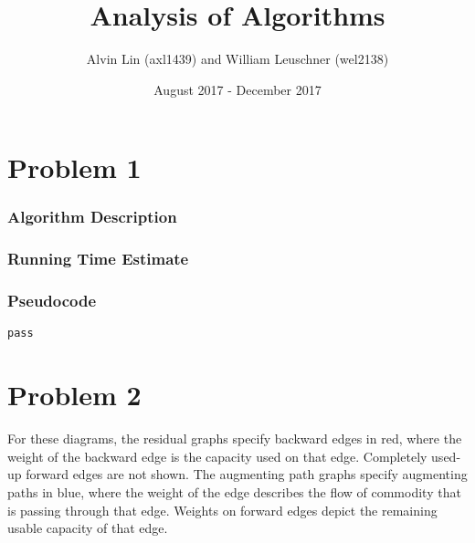 \documentclass{math}
\title{Analysis of Algorithms}
\author{Alvin Lin (axl1439) and William Leuschner (wel2138)}
\date{August 2017 - December 2017}
\begin{document}
\maketitle


\section*{Problem 1}


\subsubsection*{Algorithm Description}


\subsubsection*{Running Time Estimate}


\subsubsection*{Pseudocode}

\begin{lstlisting}
pass
\end{lstlisting}


\section*{Problem 2}

For these diagrams, the residual graphs specify backward edges in red, where the
weight of the backward edge is the capacity used on that edge.  Completely
used-up forward edges are not shown.  The augmenting path graphs specify
augmenting paths in blue, where the weight of the edge describes the flow of
commodity that is passing through that edge.  Weights on forward edges depict
the remaining usable capacity of that edge.
\end{document}
